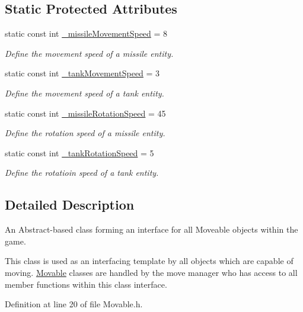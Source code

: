 \subsection*{Static Protected Attributes}
\begin{DoxyCompactItemize}
\item 
static const int \hyperlink{classMovable_aff7e2a3e3d5a6059c4fe138aa47dc048}{\-\_\-missile\-Movement\-Speed} = 8
\begin{DoxyCompactList}\small\item\em Define the movement speed of a missile entity. \end{DoxyCompactList}\item 
static const int \hyperlink{classMovable_a54cb7d3465cc78ad7d8b2f7c2d842732}{\-\_\-tank\-Movement\-Speed} = 3
\begin{DoxyCompactList}\small\item\em Define the movement speed of a tank entity. \end{DoxyCompactList}\item 
static const int \hyperlink{classMovable_afde3611f73293d67497a39fed061e3a8}{\-\_\-missile\-Rotation\-Speed} = 45
\begin{DoxyCompactList}\small\item\em Define the rotation speed of a missile entity. \end{DoxyCompactList}\item 
static const int \hyperlink{classMovable_ab4ad35a0057bdbc80385c67bec5f1a60}{\-\_\-tank\-Rotation\-Speed} = 5
\begin{DoxyCompactList}\small\item\em Define the rotatioin speed of a tank entity. \end{DoxyCompactList}\end{DoxyCompactItemize}


\subsection{Detailed Description}
An Abstract-\/based class forming an interface for all Moveable objects within the game. 

This class is used as an interfacing template by all objects which are capable of moving. \hyperlink{classMovable}{Movable} classes are handled by the move manager who has access to all member functions within this class interface. 

Definition at line 20 of file Movable.\-h.



